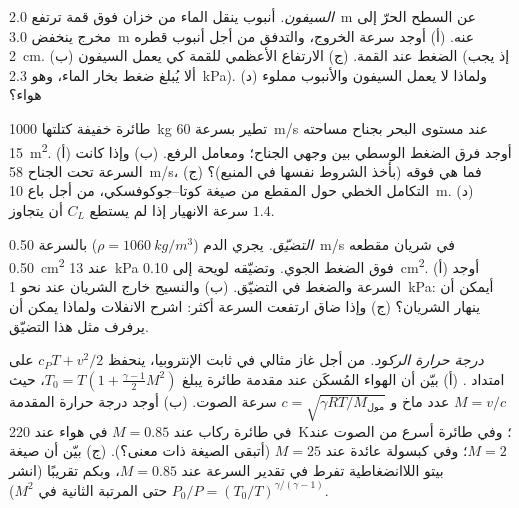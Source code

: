 \begin{exercise}[$\star\star$]\label{exo:b2:euler-bernoulli:7}
\emph{السيفون.} أنبوب ينقل الماء من خزان فوق قمة ترتفع \qty{2.0}{m}
عن السطح الحرّ إلى مخرج ينخفض \qty{3.0}{m} عنه. (أ) أوجد سرعة
الخروج، والتدفق من أجل أنبوب قطره \qty{2}{cm}. (ب) الضغط عند
القمة. (ج) الارتفاع الأعظمي للقمة كي يعمل السيفون (إذ يجب ألا
يُبلغ ضغط بخار الماء، وهو \qty{2.3}{kPa}). (د) ولماذا لا يعمل
السيفون والأنبوب مملوء هواء؟
\end{exercise}

\begin{exercise}[$\star\star$]\label{exo:b2:euler-bernoulli:8}
طائرة خفيفة كتلتها \qty{1000}{kg} تطير بسرعة \qty{60}{m/s} عند مستوى
البحر بجناح مساحته \qty{15}{m^2}. (أ) أوجد فرق الضغط الوسطي بين
وجهي الجناح؛ ومعامل الرفع. (ب) وإذا كانت السرعة تحت الجناح
\qty{58}{m/s}، فما هي فوقه (بأخذ الشروط نفسها في
المنبع)؟ (ج) التكامل الخطي حول المقطع من صيغة
كوتا--جوكوفسكي، من أجل باع \qty{10}{m}. (د) سرعة الانهيار إذا لم
يستطع $C_L$ أن يتجاوز $1.4$.
\end{exercise}

\begin{exercise}[$\star\star$]\label{exo:b2:euler-bernoulli:9}
\emph{التضيّق.} يجري الدم ($\rho = \qty{1060}{kg/m^3}$) بالسرعة \qty{0.50}{m/s}
في شريان مقطعه \qty{0.50}{cm^2} عند \qty{13}{kPa} فوق الضغط
الجوي. وتضيّقه لويحة إلى \qty{0.10}{cm^2}. (أ) أوجد السرعة والضغط
في التضيّق. (ب) والنسيج خارج الشريان عند نحو
\qty{1}{kPa}: أيمكن أن ينهار الشريان؟ (ج) وإذا ضاق ارتفعت
السرعة أكثر: اشرح الانفلات ولماذا يمكن أن يرفرف مثل هذا التضيّق.
\end{exercise}

\begin{exercise}[$\star\star\star$]\label{exo:b2:euler-bernoulli:10}
\emph{درجة حرارة الركود.} من أجل غاز مثالي في  ثابت
الإنتروبيا، ينحفظ $c_PT + v^2/2$ على امتداد . (أ) بيّن أن
الهواء المُسكَن عند مقدمة طائرة يبلغ $T_0 = T(1 +
\tfrac{\gamma - 1}{2}M^2)$، حيث $M = v/c$ عدد ماخ و $c =
\sqrt{\gamma RT/M_{\text{مول}}}$ سرعة الصوت. (ب) أوجد درجة حرارة
المقدمة في طائرة ركاب عند $M = 0.85$ في هواء عند \qty{220}{K}؛ وفي
طائرة أسرع من الصوت عند $M = 2$؛ وفي كبسولة عائدة عند $M = 25$ (أتبقى
الصيغة ذات معنى؟). (ج) بيّن أن صيغة بيتو اللاانضغاطية تفرط في
تقدير السرعة عند $M = 0.85$، وبكم تقريبًا (انشر
$P_0/P = (T_0/T)^{\gamma/(\gamma - 1)}$ حتى المرتبة الثانية في $M^2$).
\end{exercise}


